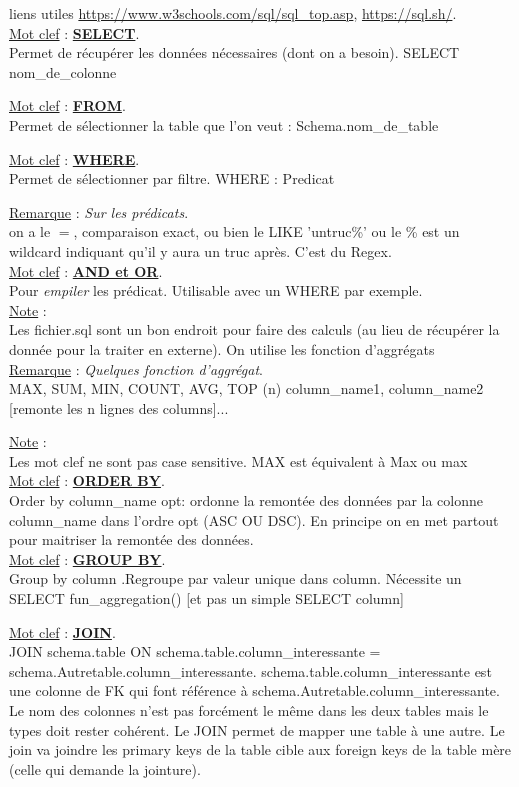 \documentclass[a4paper,12pt,twoside]{article}
\newcommand{\urlcolor}{magenta}  %
\newcommand{\keycolor}{purple} %
\newcommand{\rem}[2]{\noindent\underline{Remarque} : \textit{#1}.\\ \indent #2}
\newcommand{\note}[1]{\noindent\underline{Note} : \\ \indent #1}
\newcommand{\keyref}[2]{\hypersetup{urlcolor=\keycolor} \href{#1}{\textbf{#2}}\hypersetup{urlcolor=\urlcolor}}
\newcommand{\keyword}[3]{\noindent\underline{Mot clef} : \keyref{#1}{#2}. \\ \indent #3}
\begin{document}
liens utiles \url{https://www.w3schools.com/sql/sql_top.asp}, \url{https://sql.sh/}.\\

\keyword{https://sql.sh/cours/select}{SELECT}{Permet de récupérer les données nécessaires (dont on a besoin). SELECT nom_de_colonne}

\keyword{https://sql.sh/cours/select}{FROM}{Permet de sélectionner la table que l'on veut : Schema.nom_de_table}

\keyword{https://sql.sh/cours/where}{WHERE}{Permet de sélectionner par filtre. WHERE : Predicat}

\rem{Sur les prédicats}{on a le $=$, comparaison exact, ou bien le LIKE 'untruc\%' ou le \% est un wildcard indiquant qu'il y aura un truc après. C'est du Regex.}\\

\keyword{https://sql.sh/cours/where/and-or}{AND et OR}{Pour \textit{empiler} les prédicat. Utilisable avec un WHERE par exemple.}\\

\note{Les fichier.sql sont un bon endroit pour faire des calculs (au lieu de récupérer la donnée pour la traiter en externe). On utilise les fonction d'aggrégats}\\

\rem{Quelques fonction d'aggrégat}{MAX, SUM, MIN, COUNT, AVG, TOP (n) column_name1, column_name2 [remonte les n lignes des columns]...}

\note{Les mot clef ne sont pas case sensitive. MAX est équivalent à Max ou max}\\

\keyword{https://sql.sh/cours/order-by}{ORDER BY}{Order by column_name opt: ordonne la remontée des données par la colonne column_name dans l'ordre opt (ASC OU DSC). En principe on en met partout pour maitriser la remontée des données.}\\

\keyword{https://sql.sh/cours/group-by}{GROUP BY}{Group by column .Regroupe par valeur unique dans column. Nécessite un SELECT fun_aggregation() [et pas un simple SELECT column]}

\keyword{https://sql.sh/cours/jointures}{JOIN}{JOIN schema.table ON schema.table.column_interessante = schema.Autretable.column_interessante. schema.table.column_interessante est une colonne de FK qui font référence à schema.Autretable.column_interessante. Le nom des colonnes n'est pas forcément le même dans les deux tables mais le types doit rester cohérent. Le JOIN permet de mapper une table à une autre. Le join va joindre les primary keys de la table cible aux foreign keys de la table mère (celle qui demande la jointure).} \\
\end{document}
